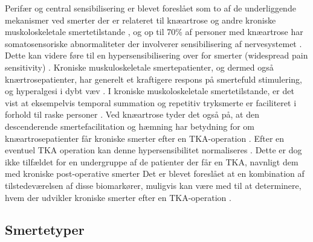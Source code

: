 Perifær og central sensibilisering er blevet foreslået som to af de underliggende mekanismer ved smerter der er relateret til knæartrose og andre kroniske muskoloskeletale smertetilstande \citep{sensitiziaionSten}, og op til 70\% af personer med knæartrose har somatosensoriske abnormaliteter der involverer sensibilisering af nervesystemet \citep{lars}. Dette kan videre føre til en  hypersensibilisering over for smerter (widespread pain sensitivity)  \citep{Petersen2016}.  Kroniske muskuloskeletale smertepatienter, og dermed også knærtrosepatienter, har generelt et kraftigere respons på smertefuld stimulering, og hyperalgesi i dybt væv \citep{sensitiziaionSten}. I kroniske muskoloskeletale smertetilstande, er det vist at eksempelvis temporal summation og repetitiv tryksmerte er faciliteret i forhold til raske personer \citep{widespread}. Ved knæartrose tyder det også på, at den descenderende smertefacilitation og hæmning har betydning for om knæartrosepatienter får kroniske smerter efter en TKA-operation \citep{Petersen2016}. Efter en eventuel TKA operation kan denne hypersensibilitet normaliseres \citep{Petersen2016} \citep{graven2012}. Dette er dog ikke tilfældet for en undergruppe af de patienter der får en TKA, navnligt dem med kroniske post-operative smerter \citep{Petersen2016}
Det er blevet foreslået at en kombination af tilstedeværelsen af disse biomarkører, muligvis kan være med til at determinere, hvem der udvikler kroniske smerter efter en TKA-operation \citep{Petersen2016}.


\subsection{Smertetyper}


